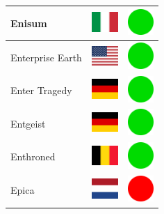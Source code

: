 \documentclass[12pt, a4paper, twoside]{report}
\begin{document}
\begin{center}
\begin{longtable}{|p{5cm}|p{2cm}|p{2cm}|}
 Enisum                                                     & \includegraphics[width=1cm]{../img/flags/it} &   \includegraphics[width=1cm]{../likes/y} \\ \hline
 Enterprise Earth                                           & \includegraphics[width=1cm]{../img/flags/us} &   \includegraphics[width=1cm]{../likes/y} \\ \hline
 Enter Tragedy                                              & \includegraphics[width=1cm]{../img/flags/de} &   \includegraphics[width=1cm]{../likes/y} \\ \hline
 Entgeist                                                   & \includegraphics[width=1cm]{../img/flags/de} &   \includegraphics[width=1cm]{../likes/y} \\ \hline
 Enthroned                                                  & \includegraphics[width=1cm]{../img/flags/be} &   \includegraphics[width=1cm]{../likes/y} \\ \hline
 Epica                                                      & \includegraphics[width=1cm]{../img/flags/nl} &   \includegraphics[width=1cm]{../likes/n} \\ \hline

\end{longtable}
\end{center}
\end{document}
